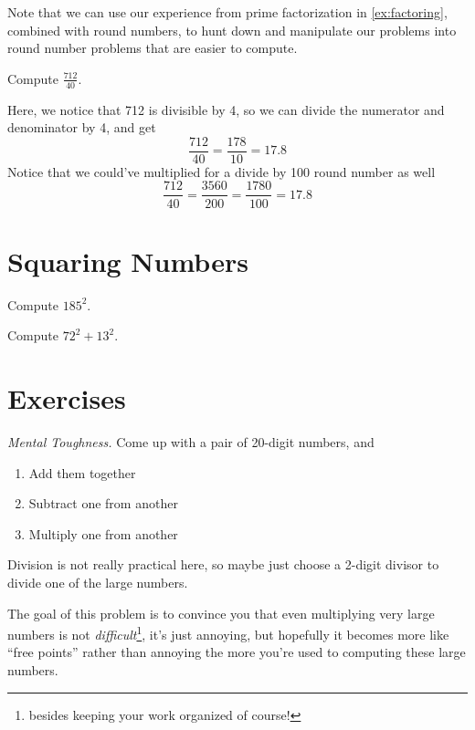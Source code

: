 Note that we can use our experience from prime factorization in \ref{ex:factoring}, combined with round numbers, to hunt down and manipulate our problems into round number problems that are easier to compute.
\begin{example}
  Compute $\frac{712}{40}$.
\end{example}
Here, we notice that 712 is divisible by 4, so we can divide the numerator and denominator by 4, and get
\begin{equation*}
  \frac{712}{40} = \frac{178}{10} = 17.8
\end{equation*}
Notice that we could've multiplied for a divide by 100 round number as well
\begin{equation*}
  \frac{712}{40} = \frac{3560}{200} = \frac{1780}{100} = 17.8
\end{equation*}

\section{Squaring Numbers}

\begin{example}
  Compute $185^2$.
\end{example}

\begin{example}
  Compute $72^2 + 13^2$.
\end{example}

\section{Exercises}

\begin{exercise}
  \textit{Mental Toughness.} Come up with a pair of 20-digit numbers, and
  \begin{enumerate}
    \item Add them together
    \item Subtract one from another
    \item Multiply one from another
  \end{enumerate}
  Division is not really practical here, so maybe just choose a 2-digit divisor to divide one of the large numbers.

  The goal of this problem is to convince you that even multiplying very large numbers is not \textit{difficult}\footnote{besides keeping your work organized of course!}, it's just annoying, but hopefully it becomes more like ``free points'' rather than annoying the more you're used to computing these large numbers.
\end{exercise}

